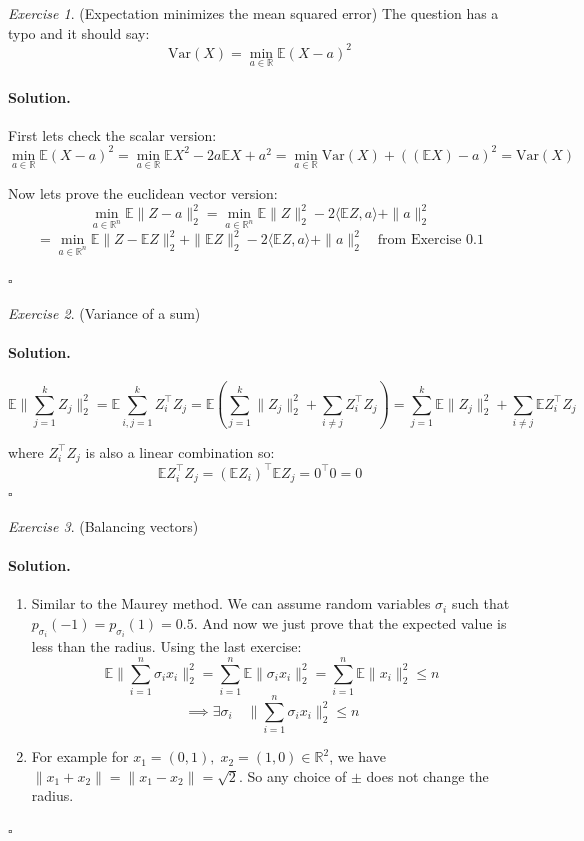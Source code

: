 \documentclass[11pt]{article}
\theoremstyle{definition}
\theoremstyle{remark}
\newtheorem{exercise}{Exercise}[section]
\newenvironment{solution}{\paragraph{Solution.}}{\hfill$\square$\medskip}
\newcommand{\E}{\mathbb{E}}
\newcommand{\Var}{\mathrm{Var}}
\newcommand{\R}{\mathbb{R}}
\newcommand{\1}{\mathbf{1}}
\begin{document}
\begin{exercise}
	
	(Expectation minimizes the mean squared error)
	The question has a typo and it should say:
	\[
	\Var(X) = \min_{a\in\R}\E(X-a)^2
	\]
	
\end{exercise}

\begin{solution}
	First lets check the scalar version:
	\[
	\min_{a\in\R}\E(X-a)^2 = \min_{a\in\R} \E X^2 - 2a \E X + a^2 = \min_{a\in\R} \Var(X) + ((\E X) - a )^2 = \Var(X)
	\]
	
	Now lets prove the euclidean vector version:
	\[
	\min_{a\in\R^n} \E\|Z - a\|_2^2 = \min_{a\in\R^n} \E \|Z\|_2^2 - 2 \langle \E Z, a \rangle + \|a\|_2^2
	\]
	\[
	= \min_{a\in\R^n} \E\|Z-\E Z\|_2^2 + \|\E Z\|_2^2 - 2 \langle \E Z, a \rangle + \|a\|_2^2 \quad \text{from Exercise }0.1
	\]

\end{solution}

\begin{exercise}
	(Variance of a sum) 
\end{exercise}

\begin{solution}
	
	
	\[
	\E\|\sum_{j=1}^{k} Z_j\|_2^2 = \E\sum_{i,j=1}^{k} Z_i^\top Z_j = \E(\sum_{j=1}^{k} \|Z_j\|_2^2 + \sum_{i\ne j} Z_i^\top Z_j) = \sum_{j=1}^{k} \E\|Z_j\|_2^2 + \sum_{i\ne j} \E Z_i^\top Z_j
	\]
	
	where \(Z_i^\top Z_j\) is also a linear combination so:
	\[
	\E Z_i^\top Z_j = (\E Z_i)^\top \E Z_j = 0^\top0 = 0
	\]
\end{solution}

\begin{exercise}
	(Balancing vectors)
\end{exercise}

\begin{solution}
	\begin{enumerate}
	\item 
	Similar to the Maurey method. We can assume random variables \(\sigma_i\) such that \(p_{\sigma_i}(-1) = p_{\sigma_i}(1) = 0.5\). And now we just prove that the expected value is less than the radius. Using the last exercise:
	\[
	 	\E \| \sum_{i=1}^{n} \sigma_ix_i \|_2^2 =  \sum_{i=1}^{n} \E \| \sigma_ix_i \|_2^2
	 	= \sum_{i=1}^{n} \E \| x_i \|_2^2 \le n
	\]
	\[
	\implies \exists \sigma_i \quad \| \sum_{i=1}^{n} \sigma_ix_i \|_2^2 \le n
	\]
	\item For example for \(x_1 = (0,1),\; x_2 = (1,0) \in \R^2\), we have \(\|x_1+x_2\|=\|x_1 - x_2\| = \sqrt{2}\). So any choice of \(\pm\) does not change the radius.
	\end{enumerate}
	
	
\end{solution}
\end{document}
